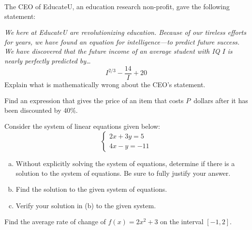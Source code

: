 \documentclass[12pt,letterpaper]{exam}
\begin{document}
\examtitle
{} 
\scores
\bottomline
\newpage


\begin{questions}

\newpage
\question[5] The CEO of EducateU, an education research non-profit, gave the following statement:

{\itshape We here at EducateU are revolutionizing education. Because of our tireless efforts for years, we have found an equation for intelligence---to predict future success. We have discovered that the future income of an average student with IQ $I$ is nearly perfectly predicted by\dots
	\[
	I^{2/3} - \dfrac{14}{I} + 20
	\]
}
Explain what is mathematically wrong about the CEO's statement. \vfill



\question[5] Find an expression that gives the price of an item that costs $P$~dollars after it has been discounted by 40\%. \vfill



\newpage
\question[15] Consider the system of linear equations given below:
	\[
	\begin{cases}
	2x + 3y= 5 \\
	4x - y= -11
	\end{cases}
	\]

\begin{enumerate}[(a)]
\item Without explicitly solving the system of equations, determine if there is a solution to the system of equations. Be sure to fully justify your answer. \vspace{4cm}
\item Find the solution to the given system of equations. \vspace{9cm}
\item Verify your solution in (b) to the given system. 
\end{enumerate}



\newpage
\question[15] Find the average rate of change of $f(x)= 2x^2 + 3$ on the interval $[-1, 2]$.




\end{questions}
\end{document}
